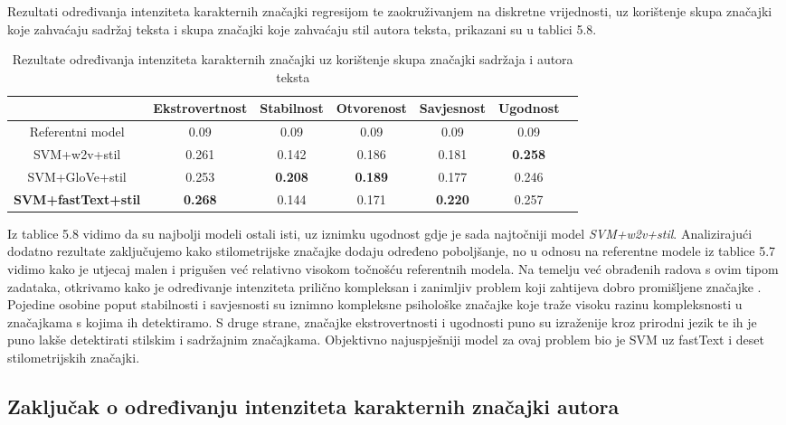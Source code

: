 \documentclass[times, utf8, zavrsni]{fer}
\begin{document}
Rezultati određivanja intenziteta karakternih značajki regresijom te zaokruživanjem na diskretne vrijednosti, uz korištenje skupa značajki koje zahvaćaju sadržaj teksta i skupa značajki koje zahvaćaju stil autora teksta, prikazani su u tablici 5.8.

\begin{table}[h!]
	\centering
	\begin{tabular}{||c | c | c | c | c | c|c||} 
		\hline
		& Ekstrovertnost & Stabilnost & Otvorenost & Savjesnost & Ugodnost \\ [0.5ex] 
		\hline\hline
		Referentni model & 0.09 & 0.09 & 0.09 & 0.09 & 0.09  \\
		\hline
		SVM+w2v+stil & 0.261 & 0.142 & 0.186 & 0.181 & \textbf{0.258}  \\
		\hline
		SVM+GloVe+stil & 0.253 & \textbf{0.208} & \textbf{0.189} & 0.177 & 0.246  \\
		\hline
		\textbf{SVM+fastText+stil} & \textbf{0.268} & 0.144 & 0.171 & \textbf{0.220} & 0.257 \\
		\hline
	\end{tabular}
	\caption{Rezultate određivanja intenziteta karakternih značajki uz korištenje skupa značajki sadržaja i autora teksta}
	\label{Table:1}
\end{table}

Iz tablice 5.8 vidimo da su najbolji modeli ostali isti, uz iznimku ugodnost gdje je sada najtočniji model \textit{SVM+w2v+stil}. Analizirajući dodatno rezultate zaključujemo kako stilometrijske značajke dodaju određeno poboljšanje, no u odnosu na referentne modele iz tablice 5.7 vidimo kako je utjecaj malen i prigušen već relativno visokom točnošću referentnih modela. Na temelju već obrađenih radova s ovim tipom zadataka, otkrivamo kako je određivanje intenziteta prilično kompleksan i zanimljiv problem koji zahtijeva dobro promišljene značajke \citep{rangle2015}. Pojedine osobine poput stabilnosti i savjesnosti su iznimno kompleksne psihološke značajke koje traže visoku razinu kompleksnosti u značajkama s kojima ih detektiramo. S druge strane, značajke ekstrovertnosti i ugodnosti puno su izraženije kroz prirodni jezik te ih je puno lakše detektirati stilskim i sadržajnim značajkama. Objektivno najuspješniji model za ovaj problem bio je SVM uz fastText i deset stilometrijskih značajki.


\newpage

\subsection*{Zaključak o određivanju intenziteta karakternih značajki autora}
 
\end{document}
